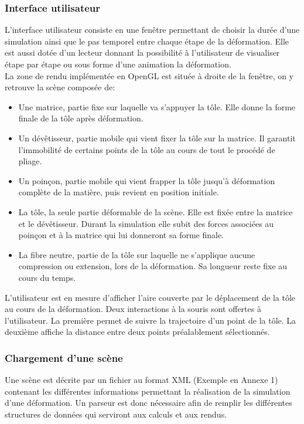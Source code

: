 \documentclass[a4paper, 11pt]{article}
\begin{document}
\subsubsection{Interface utilisateur}
L'interface utilisateur consiste en une fenêtre permettant de choisir la durée d'une simulation ainsi que le pas temporel entre chaque étape de la déformation.
Elle est aussi dotée d'un lecteur donnant la possibilité à l'utilisateur de visualiser étape par étape ou sous forme d'une animation la déformation.\\
La zone de rendu implémentée en OpenGL est située à droite de la fenêtre, on y retrouve la scène composée de:
\begin{itemize}
        \renewcommand{\labelitemi}{$\bullet$}
    \item Une matrice, partie fixe sur laquelle va s'appuyer la tôle.
        Elle donne la forme finale de la tôle après déformation.
    \item Un dévêtisseur, partie mobile qui vient fixer la tôle sur la matrice.
        Il garantit l'immobilité de certains points de la tôle au cours de tout le procédé de pliage.
    \item Un poinçon, partie mobile qui vient frapper la tôle jusqu'à déformation complète de la matière, puis revient en position initiale.
    \item La tôle, la seule partie déformable de la scène.
        Elle est fixée entre la matrice et le dévêtisseur.
        Durant la simulation elle subit des forces associées au poinçon et à la matrice qui lui donneront sa forme finale.
    \item La fibre neutre, partie de la tôle sur laquelle ne s'applique aucune compression ou extension, lors de la déformation.
        Sa longueur reste fixe au cours du temps.
\end{itemize}
L'utilisateur est en mesure d'afficher l'aire couverte par le déplacement de la tôle au cours de la déformation.
Deux interactions à la souris sont offertes à l'utilisateur.
La première permet de suivre la trajectoire d'un point de la tôle.
La deuxième affiche la distance entre deux points préalablement sélectionnés.

\subsubsection{Chargement d'une scène}
Une scène est décrite par un fichier au format XML (Exemple en Annexe 1) contenant les différentes informations permettant la réalisation de la simulation d'une déformation.
Un parseur est donc nécessaire afin de remplir les différentes structures de données qui serviront aux calculs et aux rendus.
\end{document}
